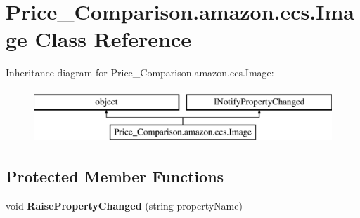 \hypertarget{class_price___comparison_1_1amazon_1_1ecs_1_1_image}{\section{Price\-\_\-\-Comparison.\-amazon.\-ecs.\-Image Class Reference}
\label{class_price___comparison_1_1amazon_1_1ecs_1_1_image}
}


 


Inheritance diagram for Price\-\_\-\-Comparison.\-amazon.\-ecs.\-Image\-:\begin{figure}[H]
\begin{center}
\leavevmode
\includegraphics[height=2.000000cm]{class_price___comparison_1_1amazon_1_1ecs_1_1_image}
\end{center}
\end{figure}
\subsection*{Protected Member Functions}
\begin{DoxyCompactItemize}
\item 
\hypertarget{class_price___comparison_1_1amazon_1_1ecs_1_1_image_a79211cf082ea96881be204e8bf08d7b9}{void {\bfseries Raise\-Property\-Changed} (string property\-Name)}\label{class_price___comparison_1_1amazon_1_1ecs_1_1_image_a79211cf082ea96881be204e8bf08d7b9}

\end{DoxyCompactItemize}
